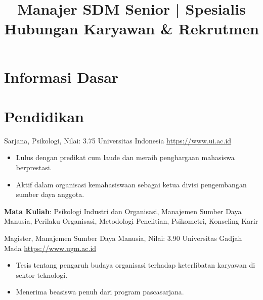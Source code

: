 \documentclass[a4paper, serif, 10pt]{moderncv}
\title{Manajer SDM Senior | Spesialis Hubungan Karyawan \& Rekrutmen}
\begin{document}
\maketitle

\section{Informasi Dasar}

\section{Pendidikan}

        {Sarjana, Psikologi, Nilai: 3.75}
        {Universitas Indonesia}
        {\url{https://www.ui.ac.id}}
        {}
        {\begin{itemize}
\item Lulus dengan predikat cum laude dan meraih penghargaan mahasiswa berprestasi.
\item Aktif dalam organisasi kemahasiswaan sebagai ketua divisi pengembangan sumber daya anggota.
\end{itemize}
\textbf{Mata Kuliah}: Psikologi Industri dan Organisasi, Manajemen Sumber Daya Manusia, Perilaku Organisasi, Metodologi Penelitian, Psikometri, Konseling Karir}

        {Magister, Manajemen Sumber Daya Manusia, Nilai: 3.90}
        {Universitas Gadjah Mada}
        {\url{https://www.ugm.ac.id}}
        {}
        {\begin{itemize}
\item Tesis tentang pengaruh budaya organisasi terhadap keterlibatan karyawan di sektor teknologi.
\item Menerima beasiswa penuh dari program pascasarjana.
\end{itemize}}
\end{document}
